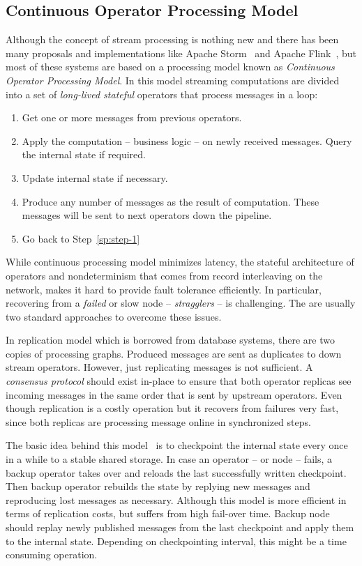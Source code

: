 \subsection{Continuous Operator Processing Model}
\label{sp:continues-model}

Although the concept of stream processing is nothing new and there has been many proposals and implementations like Apache Storm~\cite{Storm} and Apache Flink~\cite{flink}, but most of these systems are based on a processing model known as \emph{Continuous Operator Processing Model}. In this model streaming computations are divided into a set of \emph{long-lived stateful} operators that process messages in a loop:
\begin{enumerate}
    \item \label{sp:step-1}Get one or more messages from previous operators.
    \item Apply the computation -- business logic -- on newly received messages. Query the internal state if required.
    \item Update internal state if necessary.
    \item Produce any number of messages as the result of computation. These messages will be sent to next operators down the pipeline.
    \item Go back to Step~\ref{sp:step-1}
\end{enumerate}
While continuous processing model minimizes latency, the stateful architecture of operators and nondeterminism that comes from record interleaving on the network, makes it hard to provide fault tolerance efficiently. In particular, recovering from a \emph{failed} or slow node -- \emph{stragglers} -- is challenging. The are usually two standard approaches to overcome these issues.
\begin{description}[leftmargin=0pt]
    \item[Replication] In replication model which is borrowed from database systems, there are two copies of processing graphs. Produced messages are sent as duplicates to down stream operators. However, just replicating messages is not sufficient. A \emph{consensus protocol} should exist in-place to ensure that both operator replicas see incoming messages in the same order that is sent by upstream operators. Even though replication is a costly operation but it recovers from failures very fast, since both replicas are processing message online in synchronized steps.
    \item[Upstream Backup] The basic idea behind this model~\cite{Hwang:2005} is to checkpoint the internal state every once in a while to a stable shared storage. In case an operator -- or node -- fails, a backup operator takes over and reloads the last successfully written checkpoint. Then backup operator rebuilds the state by replying new messages and reproducing lost messages as necessary. Although this model is more efficient in terms of replication costs, but suffers from high fail-over time. Backup node should replay newly published messages from the last checkpoint and apply them to the internal state. Depending on checkpointing interval, this might be a time consuming operation.
\end{description}
